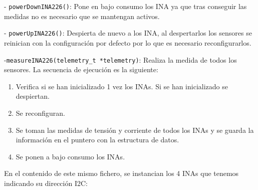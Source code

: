 \documentclass{article}
\begin{document}
- \texttt{powerDownINA226()}: Pone en bajo consumo los INA ya que tras conseguir las medidas no es necesario que se mantengan activos.

- \texttt{powerUpINA226()}: Despierta de nuevo a los INA, al despertarlos los sensores se reinician con la configuración por defecto por lo que es necesario reconfigurarlos.

-\texttt{measureINA226(telemetry\_t *telemetry)}: Realiza la medida de todos los sensores. La secuencia de ejecución es la siguiente:

\begin{enumerate}
    \item Verifica si se han inicializado 1 vez los INAs. Si se han inicializado se despiertan.
    \item Se reconfiguran.
    \item Se toman las medidas de tensión y corriente de todos los INAs y se guarda la información en el puntero con la estructura de datos.
    \item Se ponen a bajo consumo los INAs.
\end{enumerate}

En el contenido de este mismo fichero, se instancian los 4 INAs que tenemos indicando su dirección I2C:
\end{document}
